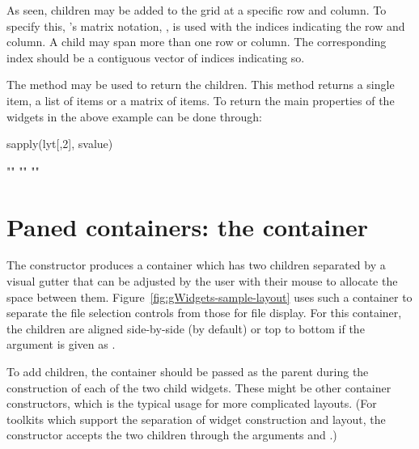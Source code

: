 As seen, children may be added to the grid at a specific row and
column. To specify this, \R's matrix notation, \code{[\ASSIGN}, is
used with the indices indicating the row and column.  A child may span
more than one row or column. The corresponding index should be a
contiguous vector of indices indicating so.  

The \code{[} method may be used to return the children. This method
returns a single item, a list of items or a matrix of items. To return
the main properties of the widgets in the above example can be done
through:
\begin{Schunk}
\begin{Sinput}
 sapply(lyt[,2], svalue)
\end{Sinput}
\begin{Soutput}
[1] "" "" ""
\end{Soutput}
\end{Schunk}





\section{Paned containers: the  container}
\label{sec:gWidgets-gpanedgroup-container}

The  constructor produces a container which
has two children separated by a visual gutter that can be
adjusted by the user with their mouse to allocate the space between them.
Figure~\ref{fig:gWidgets-sample-layout} uses such a
container to separate the file selection controls from those for file
display.  For this container, the children are aligned
side-by-side (by default) or top to bottom if the
 argument is given as
. 


To add children, the container should be passed as the parent during
the construction of each of the two child widgets.
These might be other container constructors, which
is the typical usage for more complicated layouts.
(For toolkits which support the separation of widget
construction and layout, the  constructor
accepts the two children through the arguments 
 and .)


